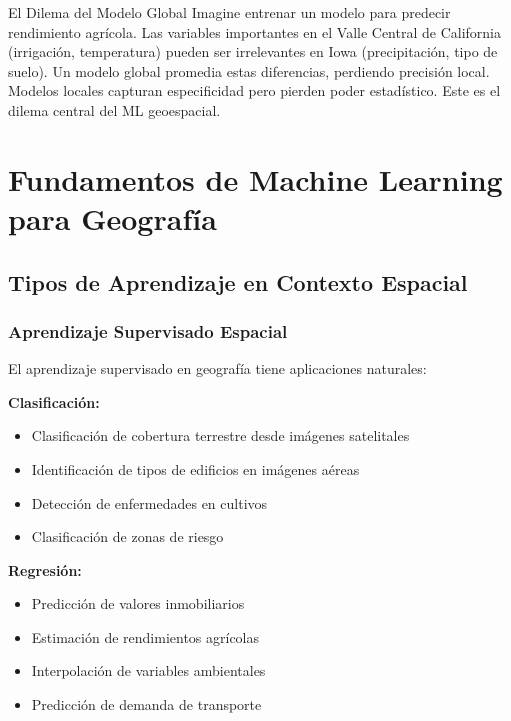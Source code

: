 \documentclass[12pt,a4paper]{article}
\begin{document}
\begin{ejemplo}{El Dilema del Modelo Global}
Imagine entrenar un modelo para predecir rendimiento agrícola. Las variables importantes en el Valle Central de California (irrigación, temperatura) pueden ser irrelevantes en Iowa (precipitación, tipo de suelo). Un modelo global promedia estas diferencias, perdiendo precisión local. Modelos locales capturan especificidad pero pierden poder estadístico. Este es el dilema central del ML geoespacial.
\end{ejemplo}

\section{Fundamentos de Machine Learning para Geografía}

\subsection{Tipos de Aprendizaje en Contexto Espacial}

\subsubsection{Aprendizaje Supervisado Espacial}

El aprendizaje supervisado en geografía tiene aplicaciones naturales:

\textbf{Clasificación:}
\begin{itemize}
    \item Clasificación de cobertura terrestre desde imágenes satelitales
    \item Identificación de tipos de edificios en imágenes aéreas
    \item Detección de enfermedades en cultivos
    \item Clasificación de zonas de riesgo
\end{itemize}

\textbf{Regresión:}
\begin{itemize}
    \item Predicción de valores inmobiliarios
    \item Estimación de rendimientos agrícolas
    \item Interpolación de variables ambientales
    \item Predicción de demanda de transporte
\end{itemize}
\end{document}
